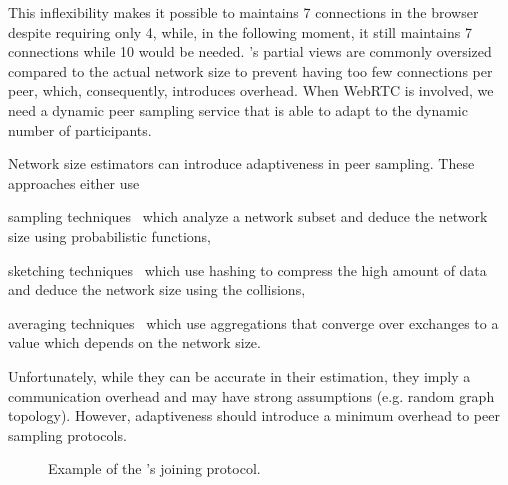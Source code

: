 
This inflexibility makes it possible to maintains 7 connections in the browser
despite requiring only 4, while, in the following moment, it still maintains 7
connections while 10 would be needed.  \CYCLON's partial views are commonly
oversized compared to the actual network size to prevent having too few
connections per peer, which, consequently, introduces overhead.  When WebRTC is
involved, we need a dynamic peer sampling service that is able to adapt to the
dynamic number of participants.

Network size estimators can introduce adaptiveness in peer sampling. These
approaches either use
\begin{inparaenum}[(i)]
\item sampling techniques~\cite{ganesh2007peer} which analyze a network subset
  and deduce the network size using probabilistic functions,
\item sketching techniques~\cite{baquero2012extrema}
  which use hashing to compress the high amount of data and deduce the network
  size using the collisions,
\item averaging techniques~\cite{jelasity2004epidemic}
  which use aggregations that converge over exchanges to a value which depends
  on the network size.
\end{inparaenum}
Unfortunately, while they can be accurate in their estimation, they imply a
communication overhead and may have strong assumptions (e.g. random graph
topology). However, adaptiveness should introduce a minimum overhead to peer
sampling protocols. %

\begin{figure*}
  \centering
  \hspace{8pt}
  \hspace{8pt}
  \caption{\label{fig:joiningexample}Example of the \SPRAY's joining
    protocol.}
\end{figure*}

